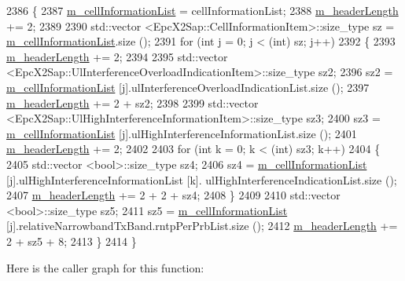 \begin{DoxyCode}
2386 \{
2387   \hyperlink{classns3_1_1EpcX2LoadInformationHeader_aa998b331b688518c15219cb752eefb16}{m\_cellInformationList} = cellInformationList;
2388   \hyperlink{classns3_1_1EpcX2LoadInformationHeader_a030cb883d52be9e5113a205d4376354c}{m\_headerLength} += 2;
2389 
2390   std::vector <EpcX2Sap::CellInformationItem>::size\_type sz = 
      \hyperlink{classns3_1_1EpcX2LoadInformationHeader_aa998b331b688518c15219cb752eefb16}{m\_cellInformationList}.size ();
2391   \textcolor{keywordflow}{for} (\textcolor{keywordtype}{int} j = 0; j < (int) sz; j++)
2392     \{
2393       \hyperlink{classns3_1_1EpcX2LoadInformationHeader_a030cb883d52be9e5113a205d4376354c}{m\_headerLength} += 2;
2394 
2395       std::vector <EpcX2Sap::UlInterferenceOverloadIndicationItem>::size\_type sz2;
2396       sz2 = \hyperlink{classns3_1_1EpcX2LoadInformationHeader_aa998b331b688518c15219cb752eefb16}{m\_cellInformationList} [j].ulInterferenceOverloadIndicationList.size ();
2397       \hyperlink{classns3_1_1EpcX2LoadInformationHeader_a030cb883d52be9e5113a205d4376354c}{m\_headerLength} += 2 + sz2;
2398 
2399       std::vector <EpcX2Sap::UlHighInterferenceInformationItem>::size\_type sz3;
2400       sz3 = \hyperlink{classns3_1_1EpcX2LoadInformationHeader_aa998b331b688518c15219cb752eefb16}{m\_cellInformationList} [j].ulHighInterferenceInformationList.size ();
2401       \hyperlink{classns3_1_1EpcX2LoadInformationHeader_a030cb883d52be9e5113a205d4376354c}{m\_headerLength} += 2;
2402 
2403       \textcolor{keywordflow}{for} (\textcolor{keywordtype}{int} k = 0; k < (int) sz3; k++)
2404         \{
2405           std::vector <bool>::size\_type sz4;
2406           sz4 = \hyperlink{classns3_1_1EpcX2LoadInformationHeader_aa998b331b688518c15219cb752eefb16}{m\_cellInformationList} [j].ulHighInterferenceInformationList [k].
      ulHighInterferenceIndicationList.size ();
2407           \hyperlink{classns3_1_1EpcX2LoadInformationHeader_a030cb883d52be9e5113a205d4376354c}{m\_headerLength} += 2 + 2 + sz4;
2408         \}
2409 
2410       std::vector <bool>::size\_type sz5;
2411       sz5 = \hyperlink{classns3_1_1EpcX2LoadInformationHeader_aa998b331b688518c15219cb752eefb16}{m\_cellInformationList} [j].relativeNarrowbandTxBand.rntpPerPrbList.size ();
2412       \hyperlink{classns3_1_1EpcX2LoadInformationHeader_a030cb883d52be9e5113a205d4376354c}{m\_headerLength} += 2 + sz5 + 8;
2413     \}
2414 \}
\end{DoxyCode}


Here is the caller graph for this function\+:




